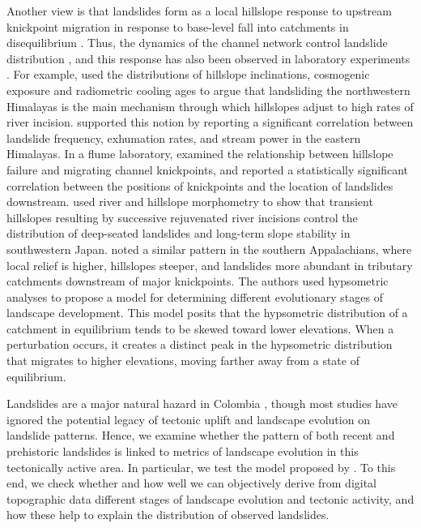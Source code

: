 \documentclass[draft]{agujournal2019}
\begin{document}
\par Another view is that landslides form as a local hillslope response to upstream knickpoint migration in response to base-level fall into catchments in disequilibrium \cite{Wobus2006, hovius2006, Whipple2002}. Thus, the dynamics of the channel network control landslide distribution \cite{montgomery1994, burbank1996}, and this response has also been observed in laboratory experiments \cite{Bigi2006, hasbargen2000}. For example,  used the distributions of hillslope inclinations, cosmogenic exposure and radiometric cooling ages to argue that landsliding the northwestern Himalayas is the main mechanism through which hillslopes adjust to high rates of river incision.  supported this notion by reporting a significant correlation between landslide frequency, exhumation rates, and stream power in the eastern Himalayas. In a flume laboratory,  examined the relationship between hillslope failure and migrating channel knickpoints, and reported a statistically significant correlation between the positions of knickpoints and the location of landslides downstream.  used river and hillslope morphometry to show that transient hillslopes resulting by successive rejuvenated river incisions control the distribution of deep-seated landslides and long-term slope stability in southwestern Japan.  noted a similar pattern in the southern Appalachians, where local relief is higher, hillslopes steeper, and landslides more abundant in tributary catchments downstream of major knickpoints. The authors used hypsometric analyses to propose a model for determining different evolutionary stages of landscape development. This model posits that the hypsometric distribution of a catchment in equilibrium tends to be skewed toward lower elevations. When a perturbation occurs, it creates a distinct peak in the hypsometric distribution that migrates to higher elevations, moving farther away from a state of equilibrium. 

\par Landslides are a major natural hazard in Colombia \cite{gomez2023spatial, aristizabal2020}, though most studies have ignored the potential legacy of tectonic uplift and landscape evolution on landslide patterns. Hence, we examine whether the pattern of both recent and prehistoric landslides is linked to metrics of landscape evolution in this tectonically active area. In particular, we test the model proposed by . To this end, we check whether and how well we can objectively derive from digital topographic data different stages of landscape evolution and tectonic activity, and how these help to explain the distribution of observed landslides.
\end{document}

